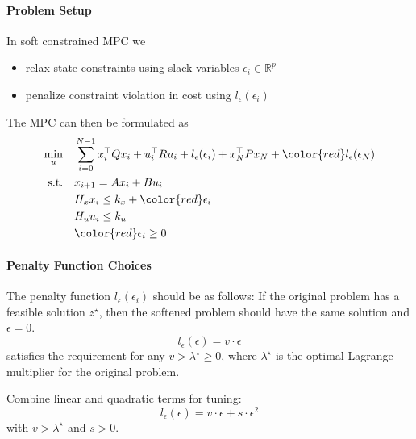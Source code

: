 \paragraph{Problem Setup}
In soft constrained MPC we
\begin{itemize}
    \item relax state constraints using slack variables $\epsilon_i \in \mathbb{R}^p$
    \item penalize constraint violation in cost using $l_\epsilon(\epsilon_i)$
\end{itemize}
The MPC can then be formulated as
\begin{align*}
    \min_u \quad      & \sum_{i=0}^{N-1} x_i^\top Q x_i + u_i^\top R u_i + l_\epsilon(\epsilon_i) + x_N^\top P x_N + {\color{red}l_\epsilon(\epsilon_N)} \\
    \text{s.t.} \quad & x_{i+1} = A x_i + B u_i                                                                                                          \\
                      & H_x x_i \leq k_x + {\color{red}\epsilon_i}                                                                                       \\
                      & H_u u_i \leq k_u                                                                                                                 \\
                      & {\color{red}\epsilon_i \geq 0}
\end{align*}

\paragraph{Penalty Function Choices}

The penalty function $l_\epsilon(\epsilon_i)$ should be as follows: If the original problem has a feasible solution $z^\star$, then the softened problem should have the same solution and $\epsilon = 0$.
\newpar{}
\begin{equation*}
    l_\epsilon(\epsilon) = v \cdot \epsilon
\end{equation*}
satisfies the requirement for any $v > \lambda^\star \geq 0$, where $\lambda^\star$ is the optimal Lagrange multiplier for the original problem.
\newpar{}

Combine linear and quadratic terms for tuning:
\begin{equation*}
    l_\epsilon(\epsilon) = v \cdot \epsilon + s \cdot \epsilon^2
\end{equation*}
with $v > \lambda^\star$ and $s > 0$.

